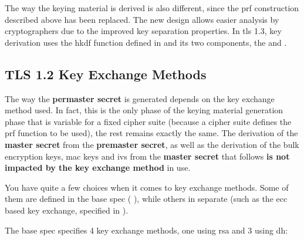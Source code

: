 \documentclass{llncs}
\begin{document}
The way the keying material is derived is also different, since the
\gls{prf} construction described above has been replaced. The
new design allows easier analysis by cryptographers due to the improved
key separation properties. In \gls{tls} 1.3, key derivation uses the
\gls{hkdf} function defined in \cite{RFC5869} and its two components,
the  and .

\subsection{TLS 1.2 Key Exchange Methods}

The way the \textbf{permaster secret} is generated depends on the key exchange
method used. In fact, this is the only phase of the keying material generation
phase that is variable for a fixed cipher suite (because a cipher suite defines
the \gls{prf} function to be used), the rest remains exactly the same. The derivation
of the \textbf{master secret} from the \textbf{premaster secret}, as well as the
derivation of the bulk encryption keys, \gls{mac} keys and \gls{iv}s from the \textbf{master secret}
that follows \textbf{is not impacted by the key exchange method} in use.

You have quite a few choices when it comes to key exchange methods. Some of them
are defined in the base spec ( \cite{RFC5246}), while others
in separate  (such as the \gls{ecc} based key exchange, specified
in  \cite{RFC4492}).

The base spec specifies 4 key exchange methods, one using \gls{rsa} and 3 using
\gls{dh}:
\end{document}
